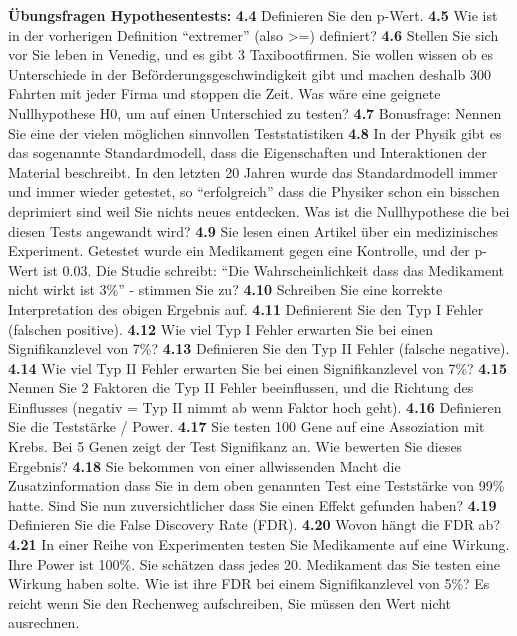 \documentclass[a4paper,twoside]{tufte-book}\usepackage[]{graphicx}\usepackage[]{color}
\begin{document}
\vspace{1cm}
\begin{fullwidth}
    
\textbf{Übungsfragen Hypothesentests:} 
\textbf{4.4} Definieren Sie den p-Wert.
\textbf{4.5} Wie ist in der vorherigen Definition “extremer” (also >=) definiert?
\textbf{4.6} Stellen Sie sich vor Sie leben in Venedig, und es gibt 3 Taxibootfirmen. Sie wollen wissen ob es Unterschiede in der Beförderungsgeschwindigkeit gibt und machen deshalb 300 Fahrten mit jeder Firma und stoppen die Zeit. Was wäre eine geignete Nullhypothese H0, um auf einen Unterschied zu testen?
\textbf{4.7} Bonusfrage: Nennen Sie eine der vielen möglichen sinnvollen Teststatistiken
\textbf{4.8} In der Physik gibt es das sogenannte Standardmodell, dass die Eigenschaften und Interaktionen der Material beschreibt. In den letzten 20 Jahren wurde das Standardmodell immer und immer wieder getestet, so “erfolgreich” dass die Physiker schon ein bisschen deprimiert sind weil Sie nichts neues entdecken. Was ist die Nullhypothese die bei diesen Tests angewandt wird?
\textbf{4.9} Sie lesen einen Artikel über ein medizinisches Experiment. Getestet wurde ein Medikament gegen eine Kontrolle, und der p-Wert ist 0.03. Die Studie schreibt: “Die Wahrscheinlichkeit dass das Medikament nicht wirkt ist 3\%” - stimmen Sie zu?
\textbf{4.10} Schreiben Sie eine korrekte Interpretation des obigen Ergebnis auf.
\textbf{4.11} Definierent Sie den Typ I Fehler (falschen positive).
\textbf{4.12} Wie viel Typ I Fehler erwarten Sie bei einen Signifikanzlevel von 7\%?
\textbf{4.13} Definieren Sie den Typ II Fehler (falsche negative).
\textbf{4.14} Wie viel Typ II Fehler erwarten Sie bei einen Signifikanzlevel von 7\%?
\textbf{4.15} Nennen Sie 2 Faktoren die Typ II Fehler beeinflussen, und die Richtung des Einflusses (negativ = Typ II nimmt ab wenn Faktor hoch geht).
\textbf{4.16} Definieren Sie die Teststärke / Power.
\textbf{4.17} Sie testen 100 Gene auf eine Assoziation mit Krebs. Bei 5 Genen zeigt der Test Signifikanz an. Wie bewerten Sie dieses Ergebnis?
\textbf{4.18} Sie bekommen von einer allwissenden Macht die Zusatzinformation dass Sie in dem oben genannten Test eine Teststärke von 99\% hatte. Sind Sie nun zuversichtlicher dass Sie einen Effekt gefunden haben?
\textbf{4.19} Definieren Sie die False Discovery Rate (FDR).
\textbf{4.20} Wovon hängt die FDR ab?
\textbf{4.21}  In einer Reihe von Experimenten testen Sie Medikamente auf eine Wirkung. Ihre Power ist 100\%. Sie schätzen dass jedes 20. Medikament das Sie testen eine Wirkung haben solte. Wie ist ihre FDR bei einem Signifikanzlevel von 5\%? Es reicht wenn Sie den Rechenweg aufschreiben, Sie müssen den Wert nicht ausrechnen.

\end{fullwidth}
\end{document}
